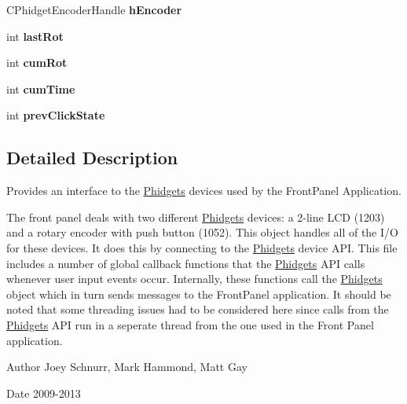 \begin{DoxyCompactItemize}
\item 
\hypertarget{class_phidgets_ab4c71371f4e0892b945ec69e1fd41f24}{C\-Phidget\-Encoder\-Handle {\bfseries h\-Encoder}}\label{class_phidgets_ab4c71371f4e0892b945ec69e1fd41f24}

\item 
\hypertarget{class_phidgets_a89b1e8e1748211fb67eb769c7c2589e3}{int {\bfseries last\-Rot}}\label{class_phidgets_a89b1e8e1748211fb67eb769c7c2589e3}

\item 
\hypertarget{class_phidgets_a5acb7a0e2d8b472761566581e2867b5e}{int {\bfseries cum\-Rot}}\label{class_phidgets_a5acb7a0e2d8b472761566581e2867b5e}

\item 
\hypertarget{class_phidgets_a07b269a048b73cc6a5ddf297f05c4837}{int {\bfseries cum\-Time}}\label{class_phidgets_a07b269a048b73cc6a5ddf297f05c4837}

\item 
\hypertarget{class_phidgets_ad4755b6633f47f534ad68b45aa5d8974}{int {\bfseries prev\-Click\-State}}\label{class_phidgets_ad4755b6633f47f534ad68b45aa5d8974}

\end{DoxyCompactItemize}


\subsection{Detailed Description}
Provides an interface to the \hyperlink{class_phidgets}{Phidgets} devices used by the Front\-Panel Application. 

The front panel deals with two different \hyperlink{class_phidgets}{Phidgets} devices\-: a 2-\/line L\-C\-D (1203) and a rotary encoder with push button (1052). This object handles all of the I/\-O for these devices. It does this by connecting to the \hyperlink{class_phidgets}{Phidgets} device A\-P\-I. This file includes a number of global callback functions that the \hyperlink{class_phidgets}{Phidgets} A\-P\-I calls whenever user input events occur. Internally, these functions call the \hyperlink{class_phidgets}{Phidgets} object which in turn sends messages to the Front\-Panel application. It should be noted that some threading issues had to be considered here since calls from the \hyperlink{class_phidgets}{Phidgets} A\-P\-I run in a seperate thread from the one used in the Front Panel application. \begin{DoxyAuthor}{Author}
Joey Schnurr, Mark Hammond, Matt Gay 
\end{DoxyAuthor}
\begin{DoxyDate}{Date}
2009-\/2013 
\end{DoxyDate}


